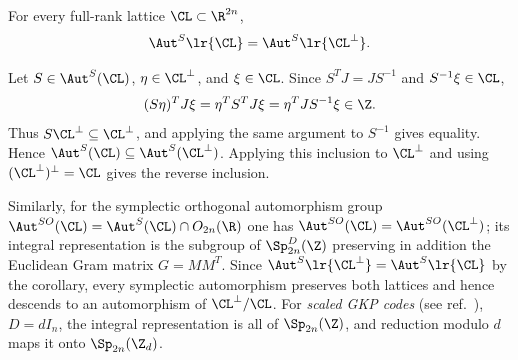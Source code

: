 \documentclass[a4paper, aps, pra, 11pt, onecolumn, tightenlines, superscriptaddress]{revtex4-2}
\begin{document}
\begin{cor}\label{cor:dual-aut}
For every full-rank lattice $\CL\subset\R^{2n}$,
\begin{equation}
\Aut^S\lr{\CL}=\Aut^S\lr{\CL^{\perp}}.
\end{equation}
\end{cor}

\proof
Let $S\in\Aut^S(\CL)$, $\eta\in\CL^{\perp}$, and $\xi\in\CL$. Since $S^TJ=JS^{-1}$ and $S^{-1}\xi\in\CL$,
\begin{equation}
(S\eta)^TJ\xi=\eta^TS^TJ\xi=\eta^TJS^{-1}\xi\in\Z.
\end{equation}
Thus $S\CL^{\perp}\subseteq\CL^{\perp}$, and applying the same argument to $S^{-1}$ gives equality. Hence $\Aut^S(\CL)\subseteq\Aut^S(\CL^{\perp})$. Applying this inclusion to $\CL^{\perp}$ and using $(\CL^{\perp})^{\perp}=\CL$ gives the reverse inclusion.
\endproof

Similarly, for the symplectic orthogonal automorphism group $\Aut^{SO}(\CL)=\Aut^{S}(\CL)\cap O_{2n}(\R)$ one has $\Aut^{SO}(\CL)=\Aut^{SO}(\CL^{\perp})$; its integral representation is the subgroup of $\Sp^D_{2n}(\Z)$ preserving in addition the Euclidean Gram matrix $G=MM^T$. 
Since $\Aut^S\lr{\CL^{\perp}}=\Aut^S\lr{\CL}$ by the corollary, every symplectic automorphism preserves both lattices and hence descends to an automorphism of $\CL^{\perp}/\CL$. For \textit{scaled GKP codes} (see ref.~\cite{Conrad_2022}), $D=dI_n$, the integral representation is all of $\Sp_{2n}(\Z)$, and reduction modulo $d$ maps it onto $\Sp_{2n}(\Z_d)$.
\end{document}
